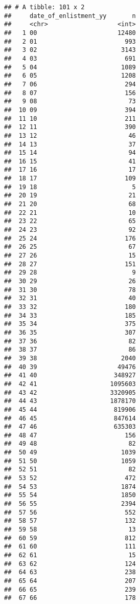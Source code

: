 \documentclass[
]{article}
\begin{document}
\begin{verbatim}
## # A tibble: 101 x 2
##     date_of_enlistment_yy       n
##     <chr>                   <int>
##   1 00                      12480
##   2 01                        993
##   3 02                       3143
##   4 03                        691
##   5 04                       1089
##   6 05                       1208
##   7 06                        294
##   8 07                        156
##   9 08                         73
##  10 09                        394
##  11 10                        211
##  12 11                        390
##  13 12                         46
##  14 13                         37
##  15 14                         94
##  16 15                         41
##  17 16                         17
##  18 17                        109
##  19 18                          5
##  20 19                         21
##  21 20                         68
##  22 21                         10
##  23 22                         65
##  24 23                         92
##  25 24                        176
##  26 25                         67
##  27 26                         15
##  28 27                        151
##  29 28                          9
##  30 29                         26
##  31 30                         78
##  32 31                         40
##  33 32                        180
##  34 33                        185
##  35 34                        375
##  36 35                        307
##  37 36                         82
##  38 37                         86
##  39 38                       2040
##  40 39                      49476
##  41 40                     348927
##  42 41                    1095603
##  43 42                    3320905
##  44 43                    1878170
##  45 44                     819906
##  46 45                     847614
##  47 46                     635303
##  48 47                        156
##  49 48                         82
##  50 49                       1039
##  51 50                       1059
##  52 51                         82
##  53 52                        472
##  54 53                       1874
##  55 54                       1850
##  56 55                       2394
##  57 56                        552
##  58 57                        132
##  59 58                         13
##  60 59                        812
##  61 60                        111
##  62 61                         15
##  63 62                        124
##  64 63                        238
##  65 64                        207
##  66 65                        239
##  67 66                        178

\end{verbatim}
\end{document}
